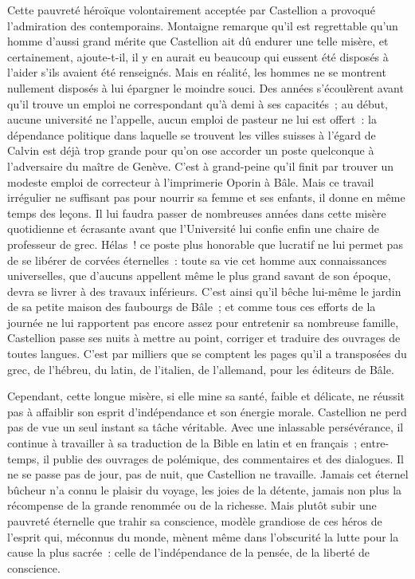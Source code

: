 \documentclass[french,twoside]{book} %
\begin{document}
\noindent Cette pauvreté héroïque volontairement acceptée par Castellion a provoqué l’admiration des contemporains. Montaigne remarque qu’il est regrettable qu’un homme d’aussi grand mérite que Castellion ait dû endurer une telle misère, et certainement, ajoute-t-il, il y en aurait eu beaucoup qui eussent été disposés à l’aider s’ils avaient été renseignés. Mais en réalité, les hommes ne se montrent nullement disposés à lui épargner le moindre souci. Des années s’écoulèrent avant qu’il trouve un emploi ne correspondant qu’à demi à ses capacités ; au début, aucune université ne l’appelle, aucun emploi de pasteur ne lui est offert : la dépendance politique dans laquelle se trouvent les villes suisses à l’égard de Calvin est déjà trop grande pour qu’on ose accorder un poste quelconque à l’adversaire du maître de Genève. C’est à grand-peine qu’il finit par trouver un modeste emploi de correcteur à l’imprimerie Oporin à Bâle. Mais ce travail irrégulier ne suffisant pas pour nourrir sa femme et ses enfants, il donne en même temps des leçons. Il lui faudra passer de nombreuses années dans cette misère quotidienne et écrasante avant que l’Université lui confie enfin une chaire de professeur de grec. Hélas ! ce poste plus honorable que lucratif ne lui permet pas de se libérer de corvées éternelles : toute sa vie cet homme aux connaissances universelles, que d’aucuns appellent même le plus grand savant de son époque, devra se livrer à des travaux inférieurs. C’est ainsi qu’il bêche lui-même le jardin de sa petite maison des faubourgs de Bâle ; et comme tous ces efforts de la journée ne lui rapportent pas encore assez pour entretenir sa nombreuse famille, Castellion passe ses nuits à mettre au point, corriger et traduire des ouvrages de toutes langues. C’est par milliers que se comptent les pages qu’il a transposées du grec, de l’hébreu, du latin, de l’italien, de l’allemand, pour les éditeurs de Bâle.\par
Cependant, cette longue misère, si elle mine sa santé, faible et délicate, ne réussit pas à affaiblir son esprit d’indépendance et son énergie morale. Castellion ne perd pas de vue un seul instant sa tâche véritable. Avec une inlassable persévérance, il continue à travailler à sa traduction de la Bible en latin et en français ; entre-temps, il publie des ouvrages de polémique, des commentaires et des dialogues. Il ne se passe pas de jour, pas de nuit, que Castellion ne travaille. Jamais cet éternel bûcheur n’a connu le plaisir du voyage, les joies de la détente, jamais non plus la récompense de la grande renommée ou de la richesse. Mais plutôt subir une pauvreté éternelle que trahir sa conscience, modèle grandiose de ces héros de l’esprit qui, méconnus du monde, mènent même dans l’obscurité la lutte pour la cause la plus sacrée : celle de l’indépendance de la pensée, de la liberté de conscience.\par
\end{document}
